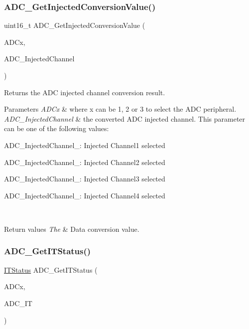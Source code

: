 \subsubsection{\texorpdfstring{ADC\_GetInjectedConversionValue()}{ADC\_GetInjectedConversionValue()}}
{\footnotesize\ttfamily uint16\+\_\+t A\+D\+C\+\_\+\+Get\+Injected\+Conversion\+Value (\begin{DoxyParamCaption}\item[{\mbox{\hyperlink{struct_a_d_c___type_def}{A\+D\+C\+\_\+\+Type\+Def}} $\ast$}]{A\+D\+Cx,  }\item[{uint8\+\_\+t}]{A\+D\+C\+\_\+\+Injected\+Channel }\end{DoxyParamCaption})}



Returns the A\+DC injected channel conversion result. 


\begin{DoxyParams}{Parameters}
{\em A\+D\+Cx} & where x can be 1, 2 or 3 to select the A\+DC peripheral. \\
\hline
{\em A\+D\+C\+\_\+\+Injected\+Channel} & the converted A\+DC injected channel. This parameter can be one of the following values\+: \begin{DoxyItemize}
\item A\+D\+C\+\_\+\+Injected\+Channel\+\_\+: Injected Channel1 selected \item A\+D\+C\+\_\+\+Injected\+Channel\+\_\+: Injected Channel2 selected \item A\+D\+C\+\_\+\+Injected\+Channel\+\_\+: Injected Channel3 selected \item A\+D\+C\+\_\+\+Injected\+Channel\+\_\+: Injected Channel4 selected \end{DoxyItemize}
\\
\hline
\end{DoxyParams}

\begin{DoxyRetVals}{Return values}
{\em The} & Data conversion value. \\
\hline
\end{DoxyRetVals}
\mbox{\label{group___a_d_c___private___functions_gaa1d3b910a83dbf14d4f68c8eef058612}} 
\subsubsection{\texorpdfstring{ADC\_GetITStatus()}{ADC\_GetITStatus()}}
{\footnotesize\ttfamily \mbox{\hyperlink{group___exported__types_gaacbd7ed539db0aacd973a0f6eca34074}{I\+T\+Status}} A\+D\+C\+\_\+\+Get\+I\+T\+Status (\begin{DoxyParamCaption}\item[{\mbox{\hyperlink{struct_a_d_c___type_def}{A\+D\+C\+\_\+\+Type\+Def}} $\ast$}]{A\+D\+Cx,  }\item[{uint16\+\_\+t}]{A\+D\+C\+\_\+\+IT }\end{DoxyParamCaption})}



